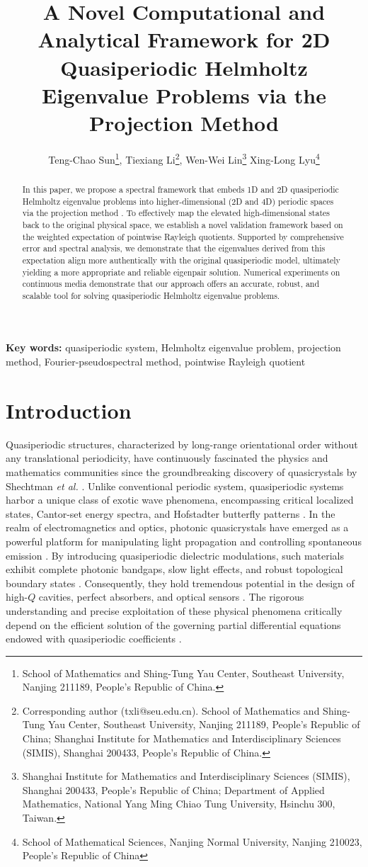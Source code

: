 \documentclass[11pt]{article}
\title{A Novel Computational and Analytical Framework for 2D Quasiperiodic Helmholtz Eigenvalue Problems via the Projection Method}
\author{
Teng-Chao Sun\footnote{School of Mathematics and Shing-Tung Yau Center, Southeast University, Nanjing 211189, People's Republic of China.}, \quad
Tiexiang Li\footnote{Corresponding author (txli@seu.edu.cn). School of Mathematics and Shing-Tung Yau Center, Southeast University, Nanjing 211189, People's Republic of China; Shanghai Institute for Mathematics and Interdisciplinary Sciences (SIMIS), Shanghai 200433, People's Republic of China.}, \quad
Wen-Wei Lin\footnote{Shanghai Institute for Mathematics and Interdisciplinary Sciences (SIMIS), Shanghai 200433, People's Republic of China; Department of Applied Mathematics, National Yang Ming Chiao Tung University, Hsinchu 300, Taiwan.} \quad
Xing-Long Lyu\footnote{School of Mathematical Sciences, Nanjing Normal University, Nanjing 210023, People's Republic of China}
}
\date{}
\numberwithin{equation}{section}
\begin{document}
\maketitle

\begin{abstract}
In this paper, we propose a spectral framework that embeds 1D and 2D quasiperiodic Helmholtz eigenvalue problems into higher-dimensional (2D and 4D) periodic spaces via the projection method \cite{jiang2014numerical, jiang2024numerical}. To effectively map the elevated high-dimensional states back to the original physical space, we establish a novel validation framework based on the weighted expectation of pointwise Rayleigh quotients. Supported by comprehensive error and spectral analysis, we demonstrate that the eigenvalues derived from this expectation align more authentically with the original quasiperiodic model, ultimately yielding a more appropriate and reliable eigenpair solution. Numerical experiments on  continuous media demonstrate that our approach offers an accurate, robust, and scalable tool for solving quasiperiodic Helmholtz eigenvalue problems.
\end{abstract}

\textbf{Key words:} quasiperiodic system, Helmholtz eigenvalue problem, projection method, Fourier-pseudospectral method, pointwise Rayleigh quotient

\section{Introduction}

Quasiperiodic structures, characterized by long-range orientational order without any translational periodicity, have continuously fascinated the physics and mathematics communities since the groundbreaking discovery of quasicrystals by Shechtman \textit{et al.} \cite{shechtman1984metallic, levine1984quasicrystals}. Unlike conventional periodic system, quasiperiodic systems harbor a unique class of exotic wave phenomena, encompassing critical localized states, Cantor-set energy spectra, and Hofstadter butterfly patterns \cite{kohmoto1987localization, suto1989singular, bellissard1989spectral}. In the realm of electromagnetics and optics, photonic quasicrystals have emerged as a powerful platform for manipulating light propagation and controlling spontaneous emission \cite{vardeny2013optics, dal2003light}. By introducing quasiperiodic dielectric modulations, such materials exhibit complete photonic bandgaps, slow light effects, and robust topological boundary states \cite{chan1998photonic, freedman2006wave, vardeny2013optics}. Consequently, they hold tremendous potential in the design of high-$Q$ cavities, perfect absorbers, and optical sensors \cite{macia2006role, steinhardt1987physics}. The rigorous understanding and precise exploitation of these physical phenomena critically depend on the efficient solution of the governing partial differential equations endowed with quasiperiodic coefficients \cite{lifshitz2003quasicrystals}.
\end{document}
